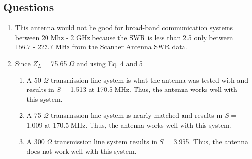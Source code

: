 \documentclass{article}
\begin{document}
\subsection{Questions}
\begin{enumerate}
	\item This antenna would not be good for broad-band communication systems between 20 Mhz - 2 GHz because the SWR is less than 2.5 only between 156.7 - 222.7 MHz from the Scanner Antenna SWR data. 
	
	\item Since $Z_L$ = 75.65 $\Omega$ and using Eq. 4 and 5
	\begin{enumerate}
		\item A 50 $\Omega$ transmission line system is what the antenna was tested with and results in $S$ = 1.513 at 170.5 MHz. Thus, the antenna works well with this system.
		\item A 75 $\Omega$ transmission line system is nearly matched and results in $S$ = 1.009 at 170.5 MHz. Thus, the antenna works well with this system.
		\item A 300 $\Omega$ transmission line system results in $S$ = 3.965. Thus, the antenna does not work well with this system.
	\end{enumerate}
\end{enumerate}
\end{document}
